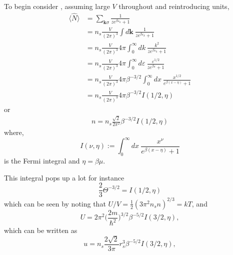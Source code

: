\documentclass[11pt,twosided]{article}
\begin{document}
To begin consider , assuming large $V$ throughout and reintroducing units,
\begin{align}
    \langle \hat{N} \rangle &= \sum_{\mathbf{k}\sigma}\frac{1}{ze^{ \beta\varepsilon_k} + 1}\\
                            &= n_s\frac{V}{(2\pi)^3}\int d \mathbf{k} \ \frac{1}{ze^{ \beta\varepsilon_k} + 1}\\
                            &= n_s\frac{V}{(2\pi)^3}4\pi\int_0^{\infty} dk \ \frac{k^2}{ze^{ \beta\varepsilon_k} + 1}\\
                            &= n_s\frac{V}{(2\pi)^3}4\pi\int_0^\infty d\varepsilon  \ \frac{\varepsilon^{1/2}}{ze^{ \beta\varepsilon} + 1}\\
                            &= n_s\frac{V}{(2\pi)^3}4\pi\beta^{-3/2}\int_0^\infty dx\ \frac{x^{1/2}}{e^{ \beta(x-\eta)} + 1}\\
                            &= n_s\frac{V}{(2\pi)^3}4\pi\beta^{-3/2} I(1/2,\eta)
\end{align}
or
\begin{align}
    n  = n_s\frac{\sqrt{2}}{2\pi^2} \beta^{-3/2} I(1/2,\eta)
\end{align}
where,
\begin{equation}
    I(\nu,\eta) := \int_0^\infty dx\ \frac{x^{\nu}}{e^{ \beta(x-\eta)} + 1}
\end{equation}
is the Fermi integral and $\eta = \beta\mu$.

This integral pops up a lot for instance
\begin{equation}
    \frac{2}{3}\Theta^{-3/2} = I(1/2,\eta)
\end{equation}
which can be seen by noting that $U/V = \frac{1}{2} (3 \pi^2 n_s n)^{2/3} = kT$, and
\begin{equation}
    U = {2\pi^2}\Big(\frac{2m}{\hbar^2}\Big)^{3/2} \beta^{-5/2} I(3/2,\eta),
\end{equation}
which can be written as
\begin{equation}
    u = n_s\frac{2\sqrt{2}}{3\pi}r_s^3 \beta^{-5/2} I(3/2,\eta),
\end{equation}
\end{document}
